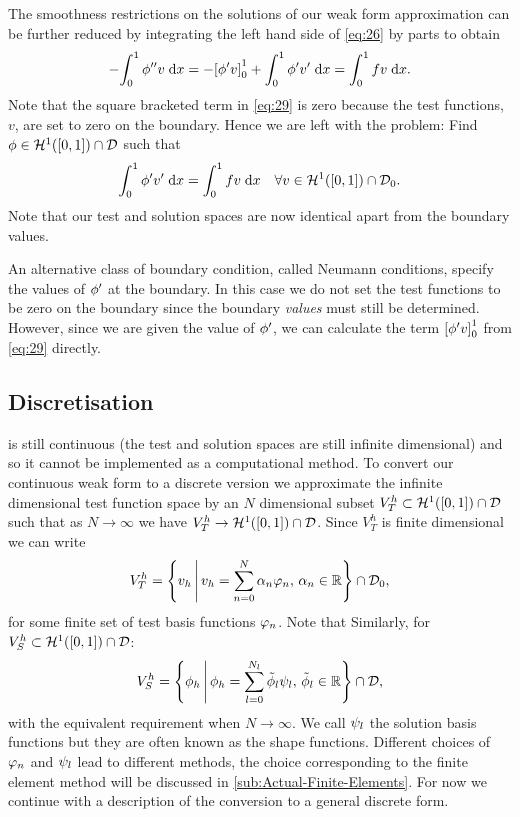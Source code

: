 {The smoothness restrictions on the solutions of our weak form approximation can be further reduced by integrating the left hand side of \cref{eq:26} by parts to obtain
\begin{equation}
  -{\int_0^1  \phi''v  {\; \mathrm{{d}}}{x}} = -{\left[ \phi' v \right]}_{0}^{1} + {\int_0^1  \phi'v'  {\; \mathrm{{d}}}{x}} = {\int_0^1 f v {\; \mathrm{{d}}}{x}}.
  \label{eq:29}
\end{equation}
Note that the square bracketed term in \cref{eq:29} is zero because the test functions, $v$, are set to zero on the boundary.
Hence we are left with the problem: Find $\phi \in \mathcal{H}^1([0,1]) \cap \mathcal{D}$ such that
\begin{equation}
  {\int_0^1  \phi'v'  {\; \mathrm{{d}}}{x}} = {\int_0^1  fv  {\; \mathrm{{d}}}{x}} \quad \forall v \in \mathcal{H}^1([0,1]) \cap \mathcal{D}_0.
  \label{eq:symmetric-weak-poisson}
\end{equation}
Note that our test and solution spaces are now identical apart from the boundary values.

An alternative class of boundary condition, called Neumann conditions, specify the values of $\phi'$ at the boundary.
In this case we do not set the test functions to be zero on the boundary since the boundary \emph{values} must still be determined.
However, since we are given the value of $\phi'$, we can calculate the term ${\left[ \phi' v \right]}_{0}^{1}$ from \cref{eq:29} directly.

\subsection{Discretisation}

 is still continuous (\ie the test and solution spaces are still infinite dimensional) and so it cannot be implemented as a computational method.
To convert our continuous weak form to a discrete version we approximate the infinite dimensional test function space by an $N$ dimensional subset $V_{T}^{h} \subset \mathcal{H}^1([0,1]) \cap \mathcal{D}$ such that as $N \rightarrow \infty$ we have $V_{T}^{h} \rightarrow \mathcal{H}^1([0,1]) \cap \mathcal{D}$.
Since $V_{T}^{h}$ is finite dimensional we can write
\begin{equation}
  V_{T}^{h} = \left\{ {{v}_h } \,\middle|\, { {v}_h = \sum_{n=0}^{N}\alpha_{n} \varphi_{n},\, \alpha_{n} \in \mathbb{R}} \right\} \cap \mathcal{D}_0,
  \label{eq:30}
\end{equation}
for some finite set of test basis functions $\varphi_{n}$.
Note that
Similarly, for $V_S^h \subset \mathcal{H}^1([0,1]) \cap \mathcal{D}$:
\begin{equation}
  \label{eq:34}
  V_{S}^{h} = \left\{ {{\phi}_h } \,\middle|\, { {\phi}_h = \sum_{l=0}^{N_l}\tilde{\phi}_l \psi_l,\, \tilde{\phi}_l \in \mathbb{R}} \right\}
  \cap \mathcal{D},
\end{equation}
with the equivalent requirement when $N \rightarrow \infty$.
We call $\psi_l$ the solution basis functions but they are often known as the shape functions.
Different choices of $\varphi_{n}$ and $\psi_l$ lead to different methods, the choice corresponding to the finite element method will be discussed in \cref{sub:Actual-Finite-Elements}.
For now we continue with a description of the conversion to a general discrete form.


}
